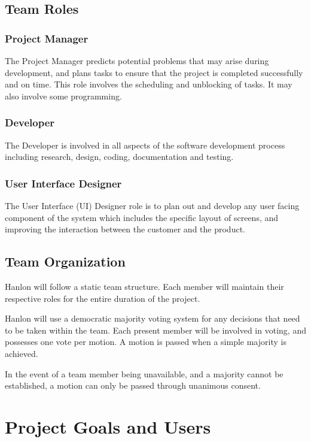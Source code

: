 \documentclass[12pt,letterpaper]{article}
\begin{document}
\subsection{Team Roles}
\subsubsection*{Project Manager}
The Project Manager predicts potential problems that may arise during development, and plans tasks to ensure that the project is completed successfully and on time. This role involves the scheduling and unblocking of tasks. It may also involve some programming.

\subsubsection*{Developer}
The Developer is involved in all aspects of the software development process including research, design, coding, documentation and testing.

\subsubsection*{User Interface Designer}
The User Interface (UI) Designer role is to plan out and develop any user facing component of the system which includes the specific layout of screens, and improving the interaction between the customer and the product.

\subsection{Team Organization}
Hanlon will follow a static team structure. Each member will maintain their respective roles for the entire duration of the project. \par

Hanlon will use a democratic majority voting system for any decisions that need to be taken within the team. Each present member will be involved in voting, and possesses one vote per motion. A motion is passed when a simple majority is achieved. \par

In the event of a team member being unavailable, and a majority cannot be established, a motion can only be passed through unanimous consent.

\clearpage
\section{Project Goals and Users}
\end{document}
